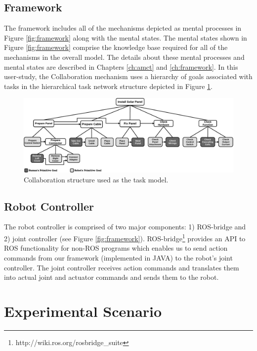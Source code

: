 \documentclass[12pt]{report}
\begin{document}
\subsection{Framework}
\label{sec:theory}
The framework includes all of the mechanisms depicted as mental processes in
Figure \ref{fig:framework} along with the mental states. The mental
states shown in Figure \ref{fig:framework} comprise the knowledge base required
for all of the mechanisms in the overall model. The details about these mental
processes and mental states are described in Chapters \ref{ch:amct} and
\ref{ch:framework}. In this user-study, the Collaboration mechanism uses a
hierarchy of goals associated with tasks in the hierarchical task network
structure depicted in Figure \ref{fig:collaboration_structure}.

\begin{figure}[tbh]
  \centering
  \includegraphics[width=1\textwidth]{figure/collaborationStructure.pdf}
  \caption{{\fontsize{10}{10}\selectfont Collaboration structure used as the
  task model.}}
  \label{fig:collaboration_structure}
\end{figure}

\subsection{Robot Controller}
The robot controller is comprised of two major components: 1) ROS-bridge and 2)
joint controller (see Figure \ref{fig:framework}).
ROS-bridge\footnote{http://wiki.ros.org/rosbridge\_suite} provides an API to ROS
functionality for non-ROS programs which enables us to send action commands from
our framework (implemented in JAVA) to the robot's joint controller. The joint
controller receives action commands and translates them into actual joint and
actuator commands and sends them to the robot.

\section{Experimental Scenario}
\end{document}
